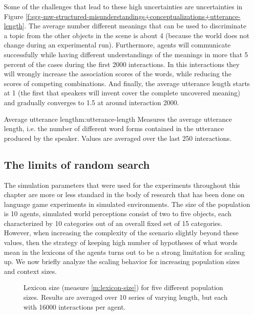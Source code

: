 Some of the challenges that lead to these high uncertainties are
uncertainties in Figure
\ref{f:sgg-mw-structured-misunderstandings+conceptualizations+utterance-length}. The
average number different meanings that can be used to discriminate a
topic from the other objects in the scene is about 4 (because the
world does not change during an experimental run). Furthermore, agents
will communicate successfully while having different understandings of
the meanings in more that 5 percent of the cases during the first 2000
interactions. In this interactions they will wrongly increase the
association scores of the words, while reducing the scores of
competing combinations. And finally, the average utterance length
starts at 1 (the first that speakers will invent cover the complete
uncovered meaning) and gradually converges to 1.5 at around
interaction 2000.


\begin{measure}[b]{Average utterance length}{m:utterance-length}
  Measures the average utterance length, i.e. the number of different
  word forms contained in the utterance produced by the
  speaker. Values are averaged over the last 250 interactions.
\end{measure}


\subsection{The limits of random search}
\label{s:sgg-mv-structured-scaling}

The simulation parameters that were used for the experiments
throughout this chapter are more or less standard in the body of
research that has been done on language game experiments in simulated
environments. The size of the population is 10 agents, simulated world
perceptions consist of two to five objects, each characterized by 10
categories out of an overall fixed set of 15 categories. However, when
increasing the complexity of the scenario slightly beyond these
values, then the strategy of keeping high number of hypotheses of what
words mean in the lexicons of the agents turns out to be a strong
limitation for scaling up. We now briefly analyze the scaling behavior
for increasing population sizes and context sizes.


\startfiguregroup

\begin{figure}[p]
  \caption{Lexicon size (measure \ref{m:lexicon-size}) for five
    different population sizes. Results are averaged over 10 series of
    varying length, but each with 16000 interactions per agent.}
  \label{f:sgg-mw-structured-best-best-population-size-vs-lexicon-size}
\end{figure}



